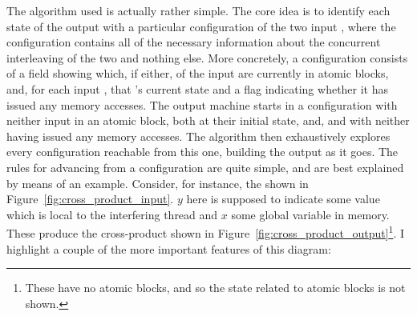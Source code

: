 The algorithm used is actually rather simple.  The core idea is to
identify each state of the output {\StateMachine} with a particular
configuration of the two input {\StateMachines}, where the
configuration contains all of the necessary information about the
concurrent interleaving of the two {\StateMachines} and nothing else.
More concretely, a configuration consists of a field showing which, if
either, of the input {\StateMachines} are currently in atomic blocks,
and, for each input {\StateMachine}, that {\StateMachine}'s current
state and a flag indicating whether it has issued any memory accesses.
The output machine starts in a configuration with neither input
{\StateMachine} in an atomic block, both {\StateMachines} at their
initial state, and, and with neither having issued any memory
accesses.  The algorithm then exhaustively explores every
configuration reachable from this one, building the output
{\StateMachine} as it goes.  The rules for advancing from a
configuration are quite simple, and are best explained by means of an
example.  Consider, for instance, the {\StateMachines} shown in
Figure~\ref{fig:cross_product_input}.  $y$ here is supposed to
indicate some value which is local to the interfering thread
{\StateMachine} and $x$ some global variable in memory.  These produce
the cross-product {\StateMachine} shown in
Figure~\ref{fig:cross_product_output}\footnote{These {\StateMachines}
  have no atomic blocks, and so the state related to atomic blocks is
  not shown.}.  I highlight a couple of the more important features of
this diagram:

